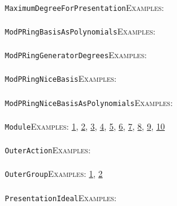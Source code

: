 \documentclass[a4paper,11pt]{report}
\begin{document}
{{ \\
 \texttt{MaximumDegreeForPresentation}{\nobreakspace}{\nobreakspace}{\nobreakspace}{\nobreakspace}\textsc{Examples:} \\
 \\
 \texttt{ModPRingBasisAsPolynomials}{\nobreakspace}{\nobreakspace}{\nobreakspace}{\nobreakspace}\textsc{Examples:} \\
 \\
 \texttt{ModPRingGeneratorDegrees}{\nobreakspace}{\nobreakspace}{\nobreakspace}{\nobreakspace}\textsc{Examples:} \\
 \\
 \texttt{ModPRingNiceBasis}{\nobreakspace}{\nobreakspace}{\nobreakspace}{\nobreakspace}\textsc{Examples:} \\
 \\
 \texttt{ModPRingNiceBasisAsPolynomials}{\nobreakspace}{\nobreakspace}{\nobreakspace}{\nobreakspace}\textsc{Examples:} \\
 \\
 \texttt{Module}{\nobreakspace}{\nobreakspace}{\nobreakspace}{\nobreakspace}\textsc{Examples:} \href{tutorial/chap10.html} {1}{\nobreakspace}, \href{../www/SideLinks/About/aboutAbelianCategories.html} {2}{\nobreakspace}, \href{../www/SideLinks/About/aboutNonabelian.html} {3}{\nobreakspace}, \href{../www/SideLinks/About/aboutPeriodic.html} {4}{\nobreakspace}, \href{../www/SideLinks/About/aboutCoefficientSequence.html} {5}{\nobreakspace}, \href{../www/SideLinks/About/aboutCrossedMods.html} {6}{\nobreakspace}, \href{../www/SideLinks/About/aboutGouter.html} {7}{\nobreakspace}, \href{../www/SideLinks/About/aboutIntro.html} {8}{\nobreakspace}, \href{../www/SideLinks/About/aboutTorAndExt.html} {9}{\nobreakspace}, \href{../www/SideLinks/About/aboutTwistedCoefficients.html} {10}{\nobreakspace} \\
 \\
 \texttt{OuterAction}{\nobreakspace}{\nobreakspace}{\nobreakspace}{\nobreakspace}\textsc{Examples:} \\
 \\
 \texttt{OuterGroup}{\nobreakspace}{\nobreakspace}{\nobreakspace}{\nobreakspace}\textsc{Examples:} \href{../www/SideLinks/About/aboutCoefficientSequence.html} {1}{\nobreakspace}, \href{../www/SideLinks/About/aboutGouter.html} {2}{\nobreakspace} \\
 \\
 \texttt{PresentationIdeal}{\nobreakspace}{\nobreakspace}{\nobreakspace}{\nobreakspace}\textsc{Examples:} \\
}}
\end{document}
